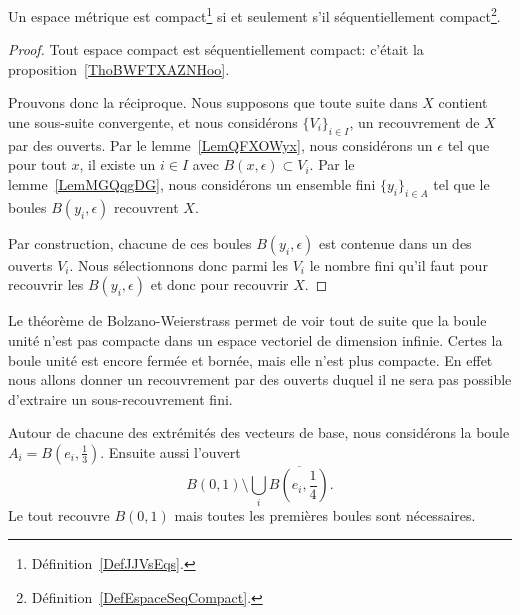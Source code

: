 \begin{theorem}\label{ThoBWFTXAZNH}
    Un espace métrique est compact\footnote{Définition~\ref{DefJJVsEqs}.} si et seulement s'il séquentiellement compact\footnote{Définition~\ref{DefEspaceSeqCompact}.}.
\end{theorem}

\begin{proof}
  Tout espace compact est séquentiellement compact: c'était la proposition~\ref{ThoBWFTXAZNHoo}.

   Prouvons donc la réciproque. Nous supposons que toute suite dans \( X\) contient une sous-suite convergente, et nous considérons \( \{ V_i \}_{i\in I}\), un recouvrement de \( X\) par des ouverts. Par le lemme~\ref{LemQFXOWyx}, nous considérons un \( \epsilon\) tel que pour tout \( x\), il existe un \( i\in I\) avec \( B(x,\epsilon)\subset V_i\). Par le lemme~\ref{LemMGQqgDG}, nous considérons un ensemble fini \( \{ y_i \}_{i\in A}\) tel que le boules \( B(y_i,\epsilon)\) recouvrent \( X\).

   Par construction, chacune de ces boules \( B(y_i,\epsilon)\) est contenue dans un des ouverts \( V_i\). Nous sélectionnons donc parmi les \( V_i\) le nombre fini qu'il faut pour recouvrir les \( B(y_i,\epsilon)\) et donc pour recouvrir \( X\).
\end{proof}


\begin{example}\label{ExEFYooTILPDk}
    Le théorème de Bolzano-Weierstrass permet de voir tout de suite que la boule unité n'est pas compacte dans un espace vectoriel de dimension infinie. Certes la boule unité est encore fermée et bornée, mais elle n'est plus compacte. En effet nous allons donner un recouvrement par des ouverts duquel il ne sera pas possible d'extraire un sous-recouvrement fini.

    Autour de chacune des extrémités des vecteurs de base, nous considérons la boule \( A_i=B(e_i,\frac{1}{ 3 })\). Ensuite aussi l'ouvert
    \begin{equation}
        B(0,1)\setminus\bigcup_i\overline{ B(e_i,\frac{1}{ 4 })}.
    \end{equation}
    Le tout recouvre \( B(0,1)\) mais toutes les premières boules sont nécessaires.
\end{example}


